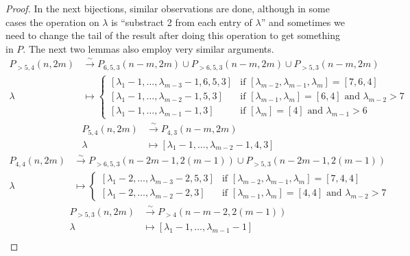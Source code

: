 \documentclass[12pt, a4paper]{article}
\theoremstyle{remark}
\begin{document}
\begin{proof}
  In the next bijections, similar observations are done, although in some cases the operation on $\lambda$ is ``substract 2 from each entry of $\lambda$'' and sometimes we need to change the tail of the result after doing this operation to get something in $P$.
  The next two lemmas also employ very similar arguments.
  \begin{align*}
    P_{>5, 4}(n, 2m) &\xrightarrow{\sim} P_{6, 5, 3}(n - m, 2m) \cup P_{>6, 5, 3}(n - m, 2m) \cup P_{>5, 3}(n - m, 2m) \\
    \lambda &\mapsto
              \begin{cases}
                [\lambda_1 - 1, \dots, \lambda_{m - 3} - 1, 6, 5, 3] &\text{if }[\lambda_{m - 2}, \lambda_{m - 1}, \lambda_m] = [7, 6, 4] \\
                [\lambda_1 - 1, \dots, \lambda_{m - 2} - 1, 5, 3] &\text{if }[\lambda_{m - 1}, \lambda_m] = [6, 4]\text{ and }\lambda_{m - 2} >7 \\
                [\lambda_1 - 1, \dots, \lambda_{m - 1} - 1, 3] &\text{if }[\lambda_m] = [4]\text{ and }\lambda_{m - 1} > 6
              \end{cases}
  \end{align*}
  \begin{align*}
    P_{5, 4}(n, 2m) &\xrightarrow{\sim} P_{4, 3}(n - m, 2m) \\
    \lambda &\mapsto [\lambda_1 - 1, \dots, \lambda_{m - 2} - 1, 4, 3]
  \end{align*}
  \begin{align*}
    P_{4, 4}(n, 2m) &\xrightarrow{\sim} P_{>6, 5, 3}(n - 2m - 1, 2(m - 1)) \cup P_{>5, 3}(n - 2m - 1, 2(m - 1)) \\
    \lambda &\mapsto
              \begin{cases}
                [\lambda_1 - 2, \dots, \lambda_{m - 3} - 2, 5, 3] &\text{if }[\lambda_{m - 2}, \lambda_{m - 1}, \lambda_m] = [7, 4, 4] \\
                [\lambda_1 - 2, \dots, \lambda_{m - 2} - 2, 3] &\text{if }[\lambda_{m - 1}, \lambda_m] = [4, 4]\text{ and }\lambda_{m - 2} > 7
              \end{cases}
  \end{align*}
  \begin{align*}
    P_{>5, 3}(n, 2m) &\xrightarrow{\sim} P_{>4}(n - m - 2, 2(m - 1)) \\
    \lambda &\mapsto [\lambda_1 - 1, \dots, \lambda_{m - 1} - 1]
  \end{align*}
  \begin{align*}

\end{align*}
\end{proof}
\end{document}
